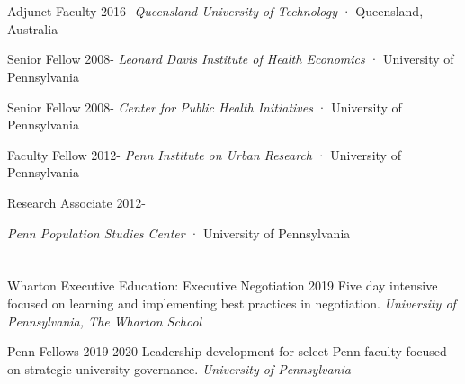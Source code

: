 \documentclass[10pt,]{article}
\begin{document}
{{{{{\section{\Large {}}

Adjunct Faculty \hfill {2016-{\small{}}} \newline
\hspace*{0.5cm} {\textit {Queensland University of Technology}} · Queensland, Australia

Senior Fellow  \hfill {2008-{\small{}}} \newline
\hspace*{0.5cm} {\textit {Leonard Davis Institute of Health Economics}} · University of Pennsylvania

Senior Fellow  \hfill {2008-{\small{}}} \newline
\hspace*{0.5cm} {\textit {Center for Public Health Initiatives}} · University of Pennsylvania

Faculty Fellow  \hfill {2012-{\small{}}} \newline
\hspace*{0.5cm} {\textit {Penn Institute on Urban Research}} · University of Pennsylvania 

Research Associate \hfill {2012-{\small{}}} \newline
\hspace*{0.5cm} {\textit {Penn Population Studies Center} · University of Pennsylvania

\section{\Large {}}

Wharton Executive Education: Executive Negotiation \hfill 2019 \newline
\hspace*{0.5cm} Five day intensive focused on learning and implementing best practices in negotiation. \newline
\hspace*{0.5cm} {\textit {University of Pennsylvania, The Wharton School}}

Penn Fellows \hfill 2019-2020 \newline
\hspace*{0.5cm} Leadership development for select Penn faculty focused on strategic university governance. \newline
\hspace*{0.5cm} {\textit {University of Pennsylvania}}
 

}}}}}}
\end{document}
